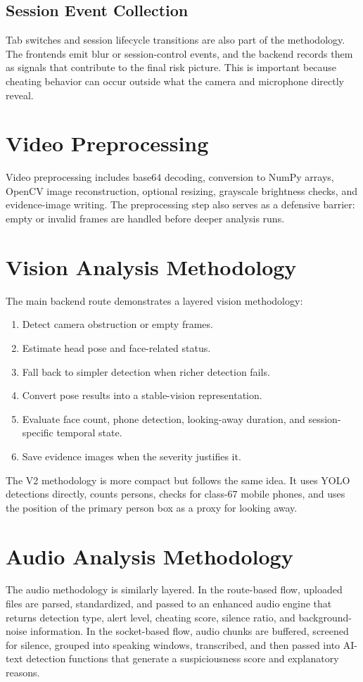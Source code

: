 \documentclass[12pt,a4paper]{extreport}
\begin{document}
\subsection{Session Event Collection}
Tab switches and session lifecycle transitions are also part of the methodology. The frontends emit blur or session-control events, and the backend records them as signals that contribute to the final risk picture. This is important because cheating behavior can occur outside what the camera and microphone directly reveal.

\section{Video Preprocessing}
Video preprocessing includes base64 decoding, conversion to NumPy arrays, OpenCV image reconstruction, optional resizing, grayscale brightness checks, and evidence-image writing. The preprocessing step also serves as a defensive barrier: empty or invalid frames are handled before deeper analysis runs.

\section{Vision Analysis Methodology}
The main backend route demonstrates a layered vision methodology:
\begin{enumerate}
  \item Detect camera obstruction or empty frames.
  \item Estimate head pose and face-related status.
  \item Fall back to simpler detection when richer detection fails.
  \item Convert pose results into a stable-vision representation.
  \item Evaluate face count, phone detection, looking-away duration, and session-specific temporal state.
  \item Save evidence images when the severity justifies it.
\end{enumerate}

The V2 methodology is more compact but follows the same idea. It uses YOLO detections directly, counts persons, checks for class-67 mobile phones, and uses the position of the primary person box as a proxy for looking away.

\section{Audio Analysis Methodology}
The audio methodology is similarly layered. In the route-based flow, uploaded files are parsed, standardized, and passed to an enhanced audio engine that returns detection type, alert level, cheating score, silence ratio, and background-noise information. In the socket-based flow, audio chunks are buffered, screened for silence, grouped into speaking windows, transcribed, and then passed into AI-text detection functions that generate a suspiciousness score and explanatory reasons.
\end{document}
